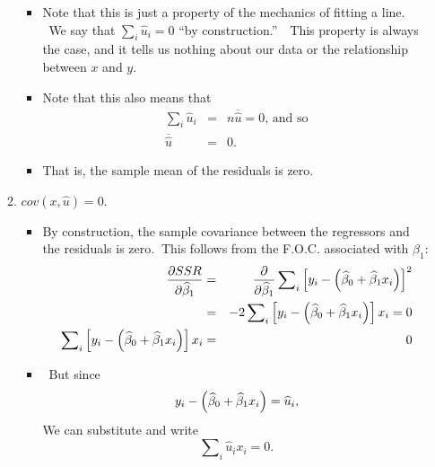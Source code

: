 \documentclass[11pt]{article}
\begin{document}
\begin{itemize}
\begin{enumerate}
\begin{itemize}
\item Note that this is just a property of the mechanics of fitting a line.
\ We say that $\sum\nolimits_{i}\widehat{u}_{i}=0$ \textquotedblleft by
construction.\textquotedblright\ \ This property is always the case, and it
tells us nothing about our data or the relationship between $x$ and $y$.

\item Note that this also means that 
\begin{eqnarray*}
\sum\nolimits_{i}\widehat{u}_{i} &=&n\overline{\widehat{u}}=0\text{, and so}
\\
\overline{\widehat{u}} &=&0.
\end{eqnarray*}

\item That is, the sample mean of the residuals is zero.
\end{itemize}

\item $cov(x,\widehat{u})=0.$

\begin{itemize}
\item By construction, the sample covariance between the regressors and the
residuals is zero. $\ $This follows from the F.O.C. associated with $%
\widehat{\beta }_{1}:$%
\begin{eqnarray*}
\frac{\partial SSR}{\partial \widehat{\beta }_{1}} &=&\frac{\partial }{%
\partial \widehat{\beta }_{1}}\sum\nolimits_{i}\left[ y_{i}-\left( \widehat{%
\beta }_{0}+\widehat{\beta }_{1}x_{i}\right) \right] ^{2} \\
&=&-2\sum\nolimits_{i}\left[ y_{i}-\left( \widehat{\beta }_{0}+\widehat{%
\beta }_{1}x_{i}\right) \right] x_{i}=0 \\
\sum\nolimits_{i}\left[ y_{i}-\left( \widehat{\beta }_{0}+\widehat{\beta }%
_{1}x_{i}\right) \right] x_{i} &=&0
\end{eqnarray*}

\item \ But since%
\begin{equation*}
y_{i}-\left( \widehat{\beta }_{0}+\widehat{\beta }_{1}x_{i}\right) =\widehat{%
u}_{i},
\end{equation*}%
We can substitute and write%
\begin{equation*}
\sum\nolimits_{i}\widehat{u}_{i}x_{i}=0.
\end{equation*}


\end{itemize}
\end{enumerate}
\end{itemize}
\end{document}
